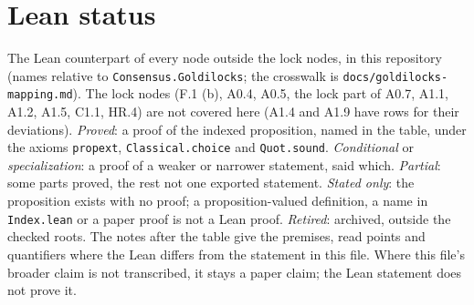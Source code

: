 \documentclass{article}
\begin{document}
\section{Lean status}\label{sec:lean-status}

The Lean counterpart of every node outside the lock nodes, in this repository (names relative to \texttt{Consensus.Goldilocks}; the
crosswalk is \texttt{docs/goldilocks-mapping.md}).  The lock nodes (F.1 (b),
A0.4, A0.5, the lock part of A0.7, A1.1, A1.2, A1.5, C1.1, HR.4) are not covered
here (A1.4 and A1.9 have rows for their deviations).  \emph{Proved}: a proof of the indexed
proposition, named in the table, under the axioms \texttt{propext},
\texttt{Classical.choice} and \texttt{Quot.sound}.  \emph{Conditional} or
\emph{specialization}: a proof of a weaker or narrower statement, said
which.  \emph{Partial}: some parts proved, the rest not one exported
statement.  \emph{Stated only}: the proposition exists with no proof; a
proposition-valued definition, a name in \texttt{Index.lean} or a paper
proof is not a Lean proof.  \emph{Retired}: archived, outside the checked
roots.  The notes after the table give the premises, read points and
quantifiers where the Lean differs from the statement in this file.  Where
this file's broader claim is not transcribed, it stays a paper claim; the
Lean statement does not prove it.
\end{document}
